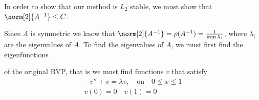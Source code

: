 \documentclass[11pt, oneside]{article}
\begin{document}
\begin{enumerate}
        In order to show that our method is $L_2$ stable, we must show that
        $\norm[2]{A^{-1}} \le C$.

        Since $A$ is symmetric we know that
        $\norm[2]{A^{-1}} = \rho(A^{-1}) = \frac{1}{\min{\lambda_i}}$, where
        $\lambda_i$ are the eigenvalues of $A$.
        To find the eigenvalues of $A$, we must first find the eigenfunctions

        of the original BVP, that is we must find functions $v$ that satisfy
        \begin{align*}
            -v'' + v = \lambda v, \quad \text{on} \quad 0 \le x \le 1 \\
            v(0) = 0 \quad v(1) = 0
        \end{align*}

\end{enumerate}
\end{document}
